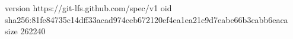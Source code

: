 version https://git-lfs.github.com/spec/v1
oid sha256:81fe84735c14dff33acad974ceb672120ef4ea1ea21c9d7eabe66b3cabb6eaca
size 262240
